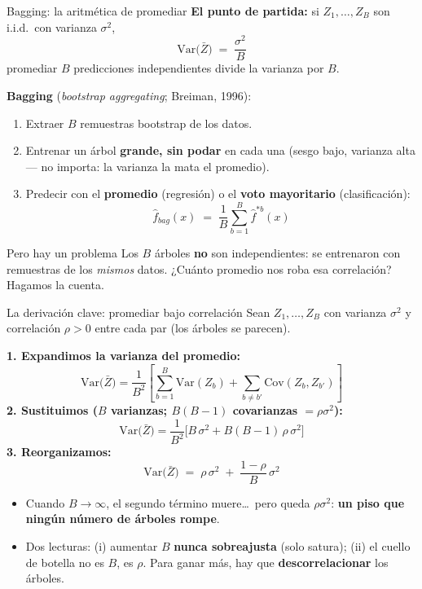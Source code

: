 \documentclass{beamer}
\newcommand{\Var}{\mathrm{Var}}
\newcommand{\Cov}{\mathrm{Cov}}
\newcommand{\1}{\mathbb{I}}
\begin{document}
\begin{frame}{Bagging: la aritmética de promediar}
\small
\textbf{El punto de partida:} si $Z_1, \ldots, Z_B$ son i.i.d.\ con varianza $\sigma^2$,
\[ \Var\big( \bar{Z} \big) \;=\; \frac{\sigma^2}{B} \]
promediar $B$ predicciones independientes divide la varianza por $B$.
\pause

\vspace{0.2cm}
\textbf{Bagging} (\emph{bootstrap aggregating}; Breiman, 1996):
\begin{enumerate}\itemsep3pt
  \item Extraer $B$ remuestras bootstrap de los datos.
  \item Entrenar un árbol \textbf{grande, sin podar} en cada una (sesgo bajo, varianza alta --- no importa: la varianza la mata el promedio).
  \item Predecir con el \textbf{promedio} (regresión) o el \textbf{voto mayoritario} (clasificación):
  \[ \hat{f}_{bag}(x) \;=\; \frac{1}{B} \sum_{b=1}^{B} \hat{f}^{*b}(x) \]
\end{enumerate}
\pause

\begin{block}{Pero hay un problema}
Los $B$ árboles \textbf{no} son independientes: se entrenaron con remuestras de los \emph{mismos} datos. ¿Cuánto promedio nos roba esa correlación? Hagamos la cuenta.
\end{block}
\end{frame}

\begin{frame}{La derivación clave: promediar bajo correlación}
\small
Sean $Z_1, \ldots, Z_B$ con varianza $\sigma^2$ y correlación $\rho > 0$ entre cada par (los árboles se parecen).
\pause

\textbf{1. Expandimos la varianza del promedio:}
\[ \Var\big( \bar{Z} \big) = \frac{1}{B^2} \left[ \sum_{b=1}^{B} \Var(Z_b) + \sum_{b \neq b'} \Cov(Z_b, Z_{b'}) \right] \]
\pause
\textbf{2. Sustituimos ($B$ varianzas; $B(B-1)$ covarianzas $= \rho\sigma^2$):}
\[ \Var\big( \bar{Z} \big) = \frac{1}{B^2} \Big[ B\,\sigma^2 + B(B-1)\,\rho\,\sigma^2 \Big] \]
\pause
\textbf{3. Reorganizamos:}
\[ \boxed{ \; \Var\big( \bar{Z} \big) \;=\; \rho\,\sigma^2 \;+\; \frac{1-\rho}{B}\,\sigma^2 \; } \]
\pause

\begin{itemize}\itemsep3pt
  \item Cuando $B \to \infty$, el segundo término muere\ldots\ pero queda $\rho\sigma^2$: \textbf{un piso que ningún número de árboles rompe}.
  \item Dos lecturas: (i) aumentar $B$ \textbf{nunca sobreajusta} (solo satura); (ii) el cuello de botella no es $B$, es $\rho$. Para ganar más, hay que \textbf{descorrelacionar} los árboles.
\end{itemize}
\end{frame}
\end{document}
